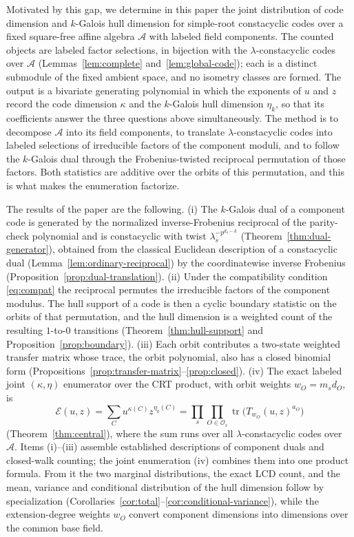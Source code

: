 \documentclass[10pt,a4paper]{article}
\newcommand{\A}{\mathcal A}
\newcommand{\Os}{\mathcal O_s}
\newcommand{\Epoly}{\mathscr E}
\numberwithin{equation}{section}
\theoremstyle{plain}
\theoremstyle{definition}
\theoremstyle{remark}
\begin{document}
Motivated by this gap, we determine in this paper the joint distribution of code
dimension and $k$-Galois hull dimension for simple-root constacyclic codes over
a fixed square-free affine algebra $\A$ with labeled field components. The
counted objects are labeled factor selections, in bijection with the
$\lambda$-constacyclic codes over $\A$ (Lemmas~\ref{lem:complete}
and~\ref{lem:global-code}); each is a distinct submodule of the fixed ambient
space, and no isometry classes are formed. The output is a bivariate generating
polynomial in which the exponents of $u$ and $z$ record the code dimension
$\kappa$ and the $k$-Galois hull dimension $\eta_k$, so that its coefficients
answer the three questions above simultaneously. The method is to
decompose $\A$ into its field components, to translate $\lambda$-constacyclic
codes into labeled selections of irreducible factors of the component moduli,
and to follow the $k$-Galois dual through the Frobenius-twisted reciprocal
permutation of those factors. Both statistics are additive over the orbits of
this permutation, and this is what makes the enumeration factorize.

The results of the paper are the following.
(i) The $k$-Galois dual of a component code is generated by the normalized
inverse-Frobenius reciprocal of the parity-check polynomial and is constacyclic
with twist $\lambda_s^{-p^{d_s-k}}$ (Theorem~\ref{thm:dual-generator}), obtained
from the classical Euclidean description of a constacyclic dual
(Lemma~\ref{lem:ordinary-reciprocal}) by the coordinatewise inverse Frobenius
(Proposition~\ref{prop:dual-translation}).
(ii) Under the compatibility condition \eqref{eq:compat} the reciprocal
permutes the irreducible factors of the component modulus. The hull support of a
code is then a cyclic boundary statistic on the orbits of that permutation, and
the hull dimension is a weighted count of the resulting $1$-to-$0$ transitions
(Theorem~\ref{thm:hull-support} and Proposition~\ref{prop:boundary}).
(iii) Each orbit contributes a two-state weighted transfer matrix whose trace,
the orbit polynomial, also has a closed binomial form
(Propositions~\ref{prop:transfer-matrix}--\ref{prop:closed}).
(iv) The exact labeled joint $(\kappa,\eta)$ enumerator over the CRT product,
with orbit weights $w_O=m_sd_O$, is
\[
\Epoly(u,z)=\sum_{C}u^{\kappa(C)}z^{\eta_k(C)}
 =\prod_{s}\prod_{O\in\Os}\operatorname{tr}\bigl(T_{w_O}(u,z)^{a_O}\bigr)
\]
(Theorem~\ref{thm:central}), where the sum runs over all $\lambda$-constacyclic
codes over $\A$. Items (i)--(iii) assemble established descriptions of component
duals and closed-walk counting; the joint enumeration (iv) combines them into
one product formula. From it the two marginal distributions, the exact LCD
count, and the mean, variance and conditional distribution of the hull dimension
follow by specialization
(Corollaries~\ref{cor:total}--\ref{cor:conditional-variance}), while the
extension-degree weights $w_O$ convert component dimensions into dimensions over
the common base field.
\end{document}
